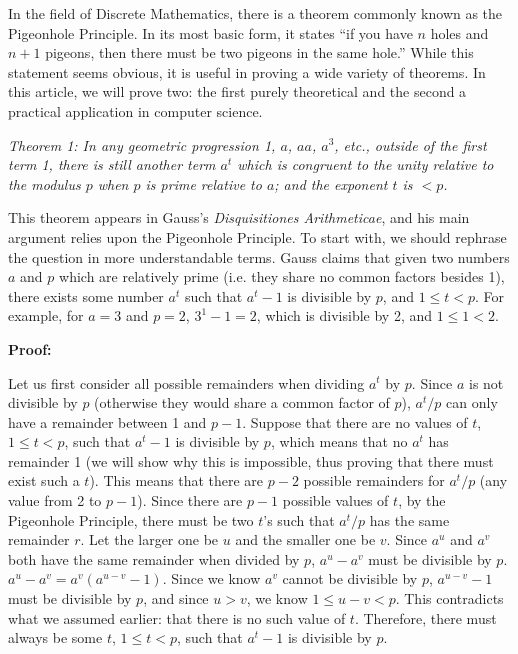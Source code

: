 
In the field of Discrete Mathematics, there is a theorem commonly known as the
Pigeonhole Principle. In its most basic form, it states ``if you have $n$
holes and $n + 1$ pigeons, then there must be two pigeons in the same hole.''
While this statement seems obvious, it is useful in proving a wide variety of
theorems. In this article, we will prove two: the first purely theoretical and
the second a practical application in computer science.

\textit{Theorem 1: In any geometric progression 1, $a$, $aa$, $a^3$, etc.,
outside of the first term 1, there is still another term $a^t$ which is
congruent to the unity relative to the modulus $p$ when $p$ is prime relative
to $a$; and the exponent $t$ is $< p$.}

This theorem appears in Gauss's
\textit{Disquisitiones Arithmeticae}, and his main argument relies upon the Pigeonhole
Principle. To start with, we should rephrase the question in more
understandable terms. Gauss claims that given two numbers $a$ and $p$ which are
relatively prime (i.e. they share no common factors besides 1), there exists
some number $a^t$ such that $a^t - 1$ is divisible by $p$, and $1 \leq t < p$.
For example, for $a = 3$ and $p = 2$, $3^1 - 1 = 2$, which is divisible by 2,
and $1 \leq 1 < 2$.

\noindent
\textbf{Proof:}

Let us first consider all possible remainders when dividing
$a^t$ by $p$. Since $a$ is not divisible by $p$ (otherwise they would share a
common factor of $p$), $a^t / p$ can only have a remainder between 1 and $p -
1$. Suppose that there are no values of $t$, $1 \leq t < p$, such that $a^t -
1$ is divisible by $p$, which means that no $a^t$ has remainder 1 (we will show
why this is impossible, thus proving that there must exist such a $t$). This
means that there are $p - 2$ possible remainders for $a^t / p$ (any value from
2 to $p - 1$). Since there are $p - 1$ possible values of $t$, by the
Pigeonhole Principle, there must be two $t$'s such that $a^t / p$ has the same
remainder $r$. Let the larger one be $u$ and the smaller one be $v$. Since
$a^u$ and $a^v$ both have the same remainder when divided by $p$, $a^u - a^v$
must be divisible by $p$. $a^u - a^v = a^v(a^{u - v} - 1)$. Since we know $a^v$
cannot be divisible by $p$, $a^{u - v} - 1$ must be divisible by $p$, and since
$u > v$, we know $1 \leq u - v < p$. This contradicts what we assumed earlier:
that there is no such value of $t$. Therefore, there must always be some $t$,
$1 \leq t < p$, such that $a^t - 1$ is divisible by $p$.

